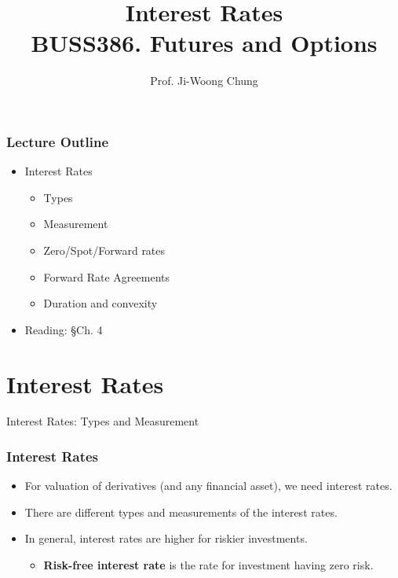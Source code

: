 \documentclass[10pt]{beamer}
\title{Interest Rates \\
 \vspace{5pt} {\footnotesize BUSS386. Futures and Options}}
\author{Prof. Ji-Woong Chung}
\institute{}
\date{}
\begin{document}
\frame{\titlepage}
\graphicspath{{figures//}}


\begin{frame}
\frametitle{Lecture Outline}
	\begin{itemize}\itemsep15pt
		\item Interest Rates \\ \vspace{5pt}
		\begin{itemize}\itemsep10pt
			\item Types
			\item Measurement
			\item Zero/Spot/Forward rates
			\item Forward Rate Agreements
			\item Duration and convexity
		\end{itemize}
		\item Reading: \S Ch. 4
	
	\end{itemize}
\end{frame}


\section{Interest Rates}


\begin{frame}
	\begin{center}
		{\Large Interest Rates: Types and Measurement}
	\end{center}
\end{frame}



\begin{frame}
	\frametitle{Interest Rates}
	\begin{itemize} \itemsep15pt
		\item For valuation of derivatives (and any financial asset), we need interest rates.
		\item There are different types and measurements of the interest rates.
		\item In general, interest rates are higher for riskier investments.\vspace{5pt}
		\begin{itemize}
			\item \textbf{Risk-free interest rate} is the rate for investment having zero risk.
		\end{itemize}		
	\end{itemize}
\end{frame}
\end{document}
